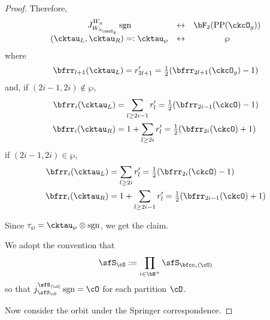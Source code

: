 \documentclass[12pt,a4paper]{amsart}
\def\abs#1{\left|{#1}\right|}
\newcommand{\sgn}{\operatorname{sgn}}
\numberwithin{equation}{section}
\theoremstyle{remark}
\def\half{{\tfrac{1}{2}}}
\def\lamckg{\lambda_{\ckcO_g}}
\def\CPP{\mathrm{PP}}
\begin{document}
\begin{proof}
{      Therefore,
      \[
        \begin{array}{ccc}
          J_{W_{\lamckg}}^{W_{g}} \sgn
          &\leftrightarrow&  \bF_{2}(\CPP(\ckcO_{g}))\\
          (\cktau_{L},\cktau_{R}) =:\cktau_{\wp}&\leftrightarrow & \wp
        \end{array}
      \]
      where
      \[
        \bfrr_{l+1}(\cktau_{L}) = r'_{2l+1} = \half (\bfrr_{2l+1}(\ckcO_{g})-1)
      \]
      and, if $(2i-1,2i)\notin \wp$,
      \[
        \begin{split}
          \bfrr_{i}(\cktau_{L}) & = \sum_{l\geq 2i-1} r'_{l}
          = \half(\bfrr_{2i-1}(\ckcO)-1)\\
          \bfrr_{i}(\cktau_{R}) & = 1 + \sum_{l\geq 2i} r'_{l} = \half(\bfrr_{2i}(\ckcO)+1)
        \end{split}
      \]
      if $(2i-1,2i)\in \wp$,
      \[
        \begin{split}
          \bfrr_{i}(\cktau_{L}) & = \sum_{l\geq 2i} r'_{l}
          = \half(\bfrr_{2i}(\ckcO)-1)\\
          \bfrr_{i}(\cktau_{R}) & = 1 + \sum_{l\geq 2i-1} r'_{l} = \half(\bfrr_{2i-1}(\ckcO)+1)
        \end{split}
      \]


      Since $\tau_{\wp} = \cktau_{\wp}\otimes \sgn$, we get the claim.

      We adopt the convention that
      \[
        \sfS_{\cO} := \prod_{i\in \bN^{+}}\sfS_{\bfcc_{i}(\cO)}
      \]
      so that $j_{\sfS_{\cO}}^{\sfS_{\abs{\cO}}}\sgn = \cO$ for each partition
      $\cO$.

      Now consider the orbit under the Springer correspondence.

}
\end{proof}
\end{document}
